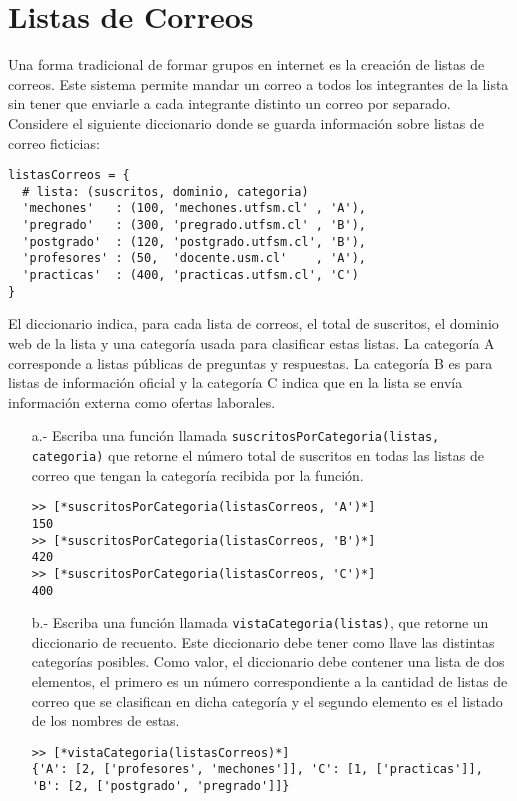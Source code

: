 \section{Listas de Correos}

Una forma tradicional de formar grupos en internet es la creación de listas de correos.
Este sistema permite mandar un correo a todos los integrantes de la lista sin tener que enviarle a cada integrante distinto un correo por separado.
Considere el siguiente diccionario donde se guarda información sobre listas de correo ficticias:

\begin{lstlisting}[style=consola]
listasCorreos = {
  # lista: (suscritos, dominio, categoria)
  'mechones'   : (100, 'mechones.utfsm.cl' , 'A'),
  'pregrado'   : (300, 'pregrado.utfsm.cl' , 'B'),
  'postgrado'  : (120, 'postgrado.utfsm.cl', 'B'),
  'profesores' : (50,  'docente.usm.cl'    , 'A'),
  'practicas'  : (400, 'practicas.utfsm.cl', 'C')
}
\end{lstlisting}
  
El diccionario indica, para cada lista de correos, el total de suscritos, el dominio web de la lista y una categoría usada para clasificar estas listas.
La categoría A corresponde a listas públicas de preguntas y respuestas.
La categoría B es para listas de información oficial y la categoría C indica que en la lista se envía información externa como ofertas laborales.
  
\begin{itemize}
    \item[a.-] Escriba una función llamada \texttt{suscritosPorCategoria(listas, categoria)} que retorne el número total de suscritos en todas las listas de correo que tengan la categoría recibida por la función.

\begin{lstlisting}[style=consola]
>> [*suscritosPorCategoria(listasCorreos, 'A')*]
150
>> [*suscritosPorCategoria(listasCorreos, 'B')*]
420
>> [*suscritosPorCategoria(listasCorreos, 'C')*]
400
\end{lstlisting}

    \item[b.-] Escriba una función llamada \texttt{vistaCategoria(listas)}, que retorne un diccionario de recuento. Este diccionario debe tener como llave las distintas categorías posibles. Como valor, el diccionario debe contener una lista de dos elementos, el primero es un número correspondiente a la cantidad de listas de correo que se clasifican en dicha categoría y el segundo elemento es el listado de los nombres de estas.

\begin{lstlisting}[style=consola]
>> [*vistaCategoria(listasCorreos)*]
{'A': [2, ['profesores', 'mechones']], 'C': [1, ['practicas']],
'B': [2, ['postgrado', 'pregrado']]}
\end{lstlisting}
\end{itemize}
